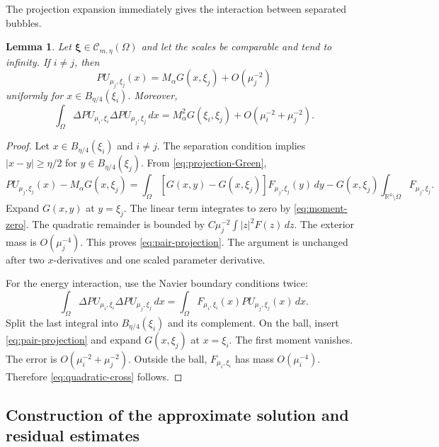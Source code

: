 \documentclass[11pt]{article}
\newtheorem{lemma}[theorem]{Lemma}
\numberwithin{equation}{section}
\begin{document}
The projection expansion immediately gives the interaction between separated bubbles.

\begin{lemma}\label{lem:pair-interaction}
Let $\boldsymbol\xi\in\mathcal C_{m,\eta}(\Omega)$ and let the scales be comparable and tend to infinity. If $i\neq j$, then
\begin{equation}\label{eq:pair-projection}
P U_{\mu_{j},\xi_{j}}(x)
=M_{\alpha}G(x,\xi_{j})+O(\mu_{j}^{-2})
\end{equation}
uniformly for $x\in B_{\eta/4}(\xi_{i})$. Moreover,
\begin{equation}\label{eq:quadratic-cross}
\int_{\Omega}
\Delta P U_{\mu_{i},\xi_{i}}
\Delta P U_{\mu_{j},\xi_{j}}\,dx
=M_{\alpha}^{2}G(\xi_{i},\xi_{j})+O(\mu_{i}^{-2}+\mu_{j}^{-2}).
\end{equation}
\end{lemma}

\begin{proof}
Let $x\in B_{\eta/4}(\xi_i)$ and $i\neq j$. The separation condition
implies $|x-y|\geq\eta/2$ for
$y\in B_{\eta/4}(\xi_j)$. From
\eqref{eq:projection-Green},
\[
PU_{\mu_j,\xi_j}(x)-M_\alpha G(x,\xi_j)
=\int_\Omega[G(x,y)-G(x,\xi_j)]F_{\mu_j,\xi_j}(y)\,dy
-G(x,\xi_j)\int_{\mathbb R^4\setminus\Omega}F_{\mu_j,\xi_j}.
\]
Expand $G(x,y)$ at $y=\xi_j$. The linear term integrates to zero by
\eqref{eq:moment-zero}. The quadratic remainder is bounded by
$C\mu_j^{-2}\int|z|^2F(z)\,dz$. The exterior mass is
$O(\mu_j^{-4})$. This proves \eqref{eq:pair-projection}. The argument
is unchanged after two $x$-derivatives and one scaled parameter
derivative.

For the energy interaction, use the Navier boundary conditions twice:
\begin{equation*}
\int_\Omega\Delta PU_{\mu_i,\xi_i}
\Delta PU_{\mu_j,\xi_j}\,dx
=\int_\Omega F_{\mu_i,\xi_i}(x)
PU_{\mu_j,\xi_j}(x)\,dx.
\end{equation*}
Split the last integral into $B_{\eta/4}(\xi_i)$ and its complement.
On the ball, insert \eqref{eq:pair-projection} and expand
$G(x,\xi_j)$ at $x=\xi_i$. The first moment vanishes. The error is
$O(\mu_i^{-2}+\mu_j^{-2})$. Outside the ball,
$F_{\mu_i,\xi_i}$ has mass $O(\mu_i^{-4})$. Therefore
\eqref{eq:quadratic-cross} follows.
\end{proof}


\subsection{Construction of the approximate solution and residual estimates}
\end{document}

